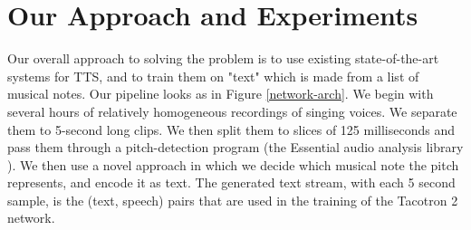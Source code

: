 \documentclass{article}
\begin{document}
\section{Our Approach and Experiments}
Our overall approach to solving the problem is to use existing state-of-the-art systems for TTS, and to train them on "text" which is made from a list of musical notes.
Our pipeline looks as in Figure \ref{network-arch}.
We begin with several hours of relatively homogeneous recordings of singing voices.
We separate them to 5-second long clips.
We then split them to slices of 125 milliseconds and pass them through a pitch-detection program (the Essential audio analysis library \cite{essentia}).
We then use a novel approach in which we decide which musical note the pitch represents, and encode it as text.
The generated text stream, with each 5 second sample, is the (text, speech) pairs that are used in the training of the Tacotron 2 network.
\end{document}
